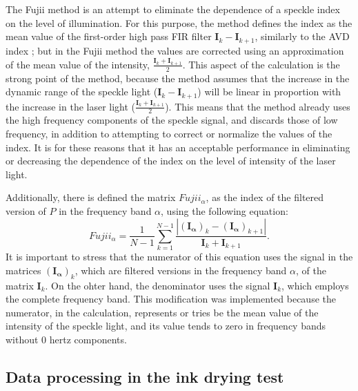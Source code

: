 \documentclass[review]{elsarticle}
\begin{document}
The Fujii method is an attempt to eliminate 
the dependence of a speckle index on the level 
of illumination. For this purpose, the method defines the index as the mean value of the  first-order high pass FIR filter 
$\mathbf{I}_{k}-\mathbf{I}_{k+1}$, similarly to the  AVD index \cite{avd};
but in the Fujii method the values are corrected using an approximation of the mean value of the intensity, 
$\frac{\mathbf{I}_{k}+\mathbf{I}_{k+1}}{2}$.
This aspect of the calculation is the strong point of the method,
because the method assumes that the increase in the dynamic range of the speckle 
light ($\mathbf{I}_{k}-\mathbf{I}_{k+1}$) 
will be linear in proportion with the increase in the laser light ($\frac{\mathbf{I}_{k}+\mathbf{I}_{k+1}}{2}$).
This means that the method already uses the high frequency components
of the speckle signal, 
and discards those of low frequency, 
in addition to attempting to correct or  normalize the values of the index.
It is for these reasons that it has an acceptable performance in
eliminating or decreasing the dependence of the index on the level of intensity of the laser light.

Additionally, there is defined the matrix $Fujii_{\alpha}$, 
as the index of the filtered version of $P$ in the frequency band $\alpha$,  using the following equation:
\begin{equation}\label{eq:contFujii3}
Fujii_{\alpha}  = \frac{1}{N-1} \sum_{k=1}^{N-1} \frac{|\mathbf{(I_{\alpha})}_{k}-\mathbf{(I_{\alpha})}_{k+1}|}{\mathbf{I}_{k}+\mathbf{I}_{k+1}}.
\end{equation}
It is important to stress that the numerator of this equation 
uses the signal in the matrices $\mathbf{(I_{\alpha})}_{k}$, which are filtered versions in the frequency band $\alpha$,
of the matrix $\mathbf{I}_{k}$.
On the ohter hand, the denominator uses the signal $\mathbf{I}_{k}$, which employs the complete frequency band.
This modification was implemented because the numerator, in the calculation, 
represents or tries be the mean value of the intensity of the speckle light, 
and its value tends to zero in frequency bands without 0 hertz components.


\subsection{Data processing in the ink drying test}
\label{subsec:numprocink}
\end{document}
